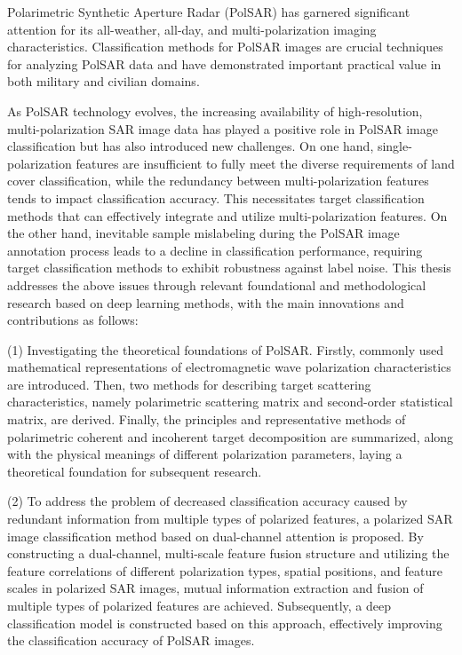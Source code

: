 
\begin{englishabstract}
    Polarimetric Synthetic Aperture Radar (PolSAR) has garnered significant attention for its all-weather, all-day, and multi-polarization imaging characteristics. Classification methods for PolSAR images are crucial techniques for analyzing PolSAR data and have demonstrated important practical value in both military and civilian domains.

    As PolSAR technology evolves, the increasing availability of high-resolution, multi-polarization SAR image data has played a positive role in PolSAR image classification but has also introduced new challenges. On one hand, single-polarization features are insufficient to fully meet the diverse requirements of land cover classification, while the redundancy between multi-polarization features tends to impact classification accuracy. This necessitates target classification methods that can effectively integrate and utilize multi-polarization features. On the other hand, inevitable sample mislabeling during the PolSAR image annotation process leads to a decline in classification performance, requiring target classification methods to exhibit robustness against label noise. This thesis addresses the above issues through relevant foundational and methodological research based on deep learning methods, with the main innovations and contributions  as follows:

    (1) Investigating the theoretical foundations of PolSAR. Firstly, commonly used mathematical representations of electromagnetic wave polarization characteristics are introduced. Then, two methods for describing target scattering characteristics, namely polarimetric scattering matrix and second-order statistical matrix, are derived. Finally, the principles and representative methods of polarimetric coherent and incoherent target decomposition are summarized, along with the physical meanings of different polarization parameters, laying a theoretical foundation for subsequent research.

    (2) To address the problem of decreased classification accuracy caused by redundant information from multiple types of polarized features, a polarized SAR image classification method based on dual-channel attention is proposed. By constructing a dual-channel, multi-scale feature fusion structure and utilizing the feature correlations of different polarization types, spatial positions, and feature scales in polarized SAR images, mutual information extraction and fusion of multiple types of polarized features are achieved. Subsequently, a deep classification model is constructed based on this approach, effectively improving the classification accuracy of PolSAR images.


\end{englishabstract}
